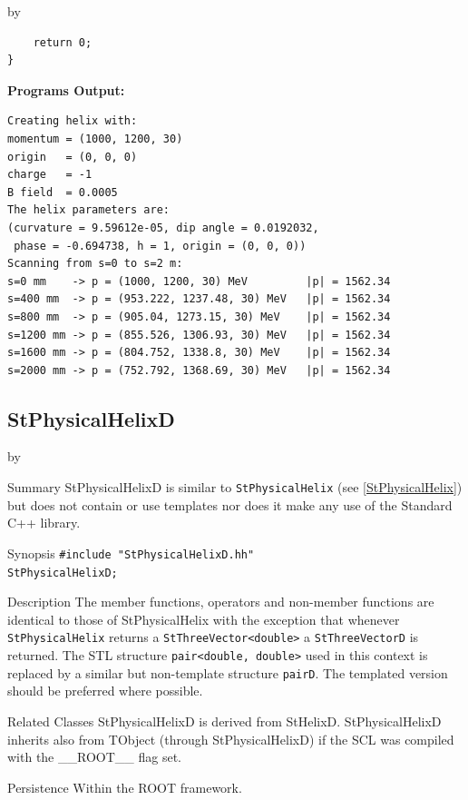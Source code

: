 \documentclass[twoside]{article}
\newcommand{\name}[1]{\textsf{#1}}%
\newcommand{\entrylabel}[1]{\mbox{\textbf{{#1}}}\hfil}%
\newenvironment{entry}
{\begin{list}{}%
    {\renewcommand{\makelabel}{\entrylabel}%
     \setlength{\labelwidth}{90pt}%
     \setlength{\leftmargin}{\labelwidth}
     \advance\leftmargin by \labelsep%
      }%
    }%
  {\end{list}}
\newcommand{\Entrylabel}[1]%
{\raisebox{0pt}[1ex][0pt]{\makebox[\labelwidth][l]%
    {\parbox[t]{\labelwidth}{\hspace{0pt}\textbf{{#1}}}}}}
\newenvironment{Entry}%
{\renewcommand{\entrylabel}{\Entrylabel}\begin{entry}}%
  {\end{entry}}
\begin{document}
\begin{Entry}
{\begin{verbatim}
    return 0;
}
\end{verbatim}
}%
{\bf Programs Output:}
{\footnotesize
\begin{verbatim}
Creating helix with:
momentum = (1000, 1200, 30)
origin   = (0, 0, 0)
charge   = -1
B field  = 0.0005
The helix parameters are:
(curvature = 9.59612e-05, dip angle = 0.0192032,
 phase = -0.694738, h = 1, origin = (0, 0, 0))
Scanning from s=0 to s=2 m:
s=0 mm    -> p = (1000, 1200, 30) MeV         |p| = 1562.34
s=400 mm  -> p = (953.222, 1237.48, 30) MeV   |p| = 1562.34
s=800 mm  -> p = (905.04, 1273.15, 30) MeV    |p| = 1562.34
s=1200 mm -> p = (855.526, 1306.93, 30) MeV   |p| = 1562.34
s=1600 mm -> p = (804.752, 1338.8, 30) MeV    |p| = 1562.34
s=2000 mm -> p = (752.792, 1368.69, 30) MeV   |p| = 1562.34
\end{verbatim}
} %
\end{Entry}

\clearpage

%
%
\subsection{StPhysicalHelixD } \label{StPhysicalHelixD}
\begin{Entry}
\item[Summary]
    StPhysicalHelixD is similar to \texttt{StPhysicalHelix}
    (see \ref{StPhysicalHelix}) but does not contain or use templates nor
    does it make any use of the Standard C++ library. 
    
\item[Synopsis]
    \verb+#include "StPhysicalHelixD.hh"+ \\
    \verb+StPhysicalHelixD;+
    
    
\item[Description]       
    The member functions, operators and non-member functions are identical
    to those of StPhysicalHelix with the exception that whenever \texttt{StPhysicalHelix} returns a
    \verb+StThreeVector<double>+ a \texttt{StThreeVectorD} is returned.
    The STL structure \verb+pair<double, double>+ used in this context is replaced
    by a similar but non-template structure \texttt{pairD}. 
    The templated version should be preferred where possible.

\item[Related Classes]
    StPhysicalHelixD is derived from StHelixD.
    StPhysicalHelixD inherits also from TObject (through StPhysicalHelixD) 
    if the SCL was compiled with the \name{\_\_ROOT\_\_} flag set.
    
\item[Persistence]
    Within the ROOT framework.

\end{Entry}
\end{document}
